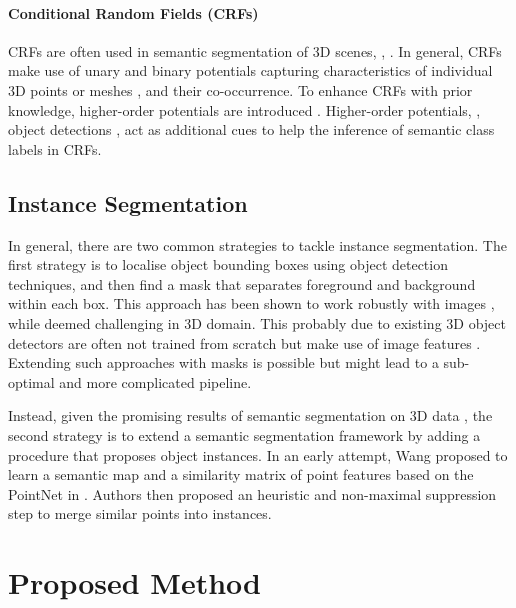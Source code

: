 \documentclass[10pt,twocolumn,letterpaper]{article}
\begin{document}
\paragraph{Conditional Random Fields (CRFs)}
CRFs are often used in semantic segmentation of 3D scenes, \eg,
\cite{valentin-mesh-cvpr13, hermans-dense-icra14, kundu-monocular-eccv14,
  wolf-fast-icra15, vineet-incremental-icra15, mccormac-semanticfusion-icra17,
  qi-3dgraph-iccv17}. In general, CRFs make use of unary and binary potentials
capturing characteristics of individual 3D points \cite{wolf-fast-icra15} or
meshes \cite{valentin-mesh-cvpr13}, and their co-occurrence. To enhance CRFs
with prior knowledge, higher-order potentials are introduced
\cite{ladicky-what-eccv10, fidler-describing-cvpr12, zhu-cosegmentation-wacv14,
  arnab-hocrf-eccv16, yang-occupancy-iros17, feng-urban-eccv18,
  pham-rpss-wacv19}. Higher-order potentials, \eg, object detections
\cite{ladicky-what-eccv10, arnab-hocrf-eccv16, pham-rpss-wacv19}, act as
additional cues to help the inference of semantic class labels in CRFs.

\subsection{Instance Segmentation}
In general, there are two common strategies to tackle instance segmentation. The
first strategy is to localise object bounding boxes using object detection
techniques, and then find a mask that separates foreground and background within
each box. This approach has been shown to work robustly with images
\cite{dai-instance-cvpr16, he-maskrcnn-iccv17}, while deemed challenging in 3D
domain. This probably due to existing 3D object detectors are often not trained
from scratch but make use of image features \cite{deng-amodal-cvpr17,
  qi-frustum-cvpr18, liang-fusion-eccv18}. Extending such approaches with masks
is possible but might lead to a sub-optimal and more complicated pipeline.

Instead, given the promising results of semantic segmentation on 3D data
\cite{qi-pointnet-cvpr17, armeni-s3dis-cvpr16, hua-pointwise-cvpr18}, the
second strategy is to extend a semantic segmentation framework by adding a
procedure that proposes object instances. In an early attempt, Wang \etal
\cite{wang-sgpn-cvpr18} proposed to learn a semantic map and a similarity matrix
of point features based on the PointNet in \cite{qi-pointnet-cvpr17}. Authors
then proposed an heuristic and non-maximal suppression step to merge similar
points into instances.
 \section{Proposed Method}
\label{sec:method}
\end{document}
